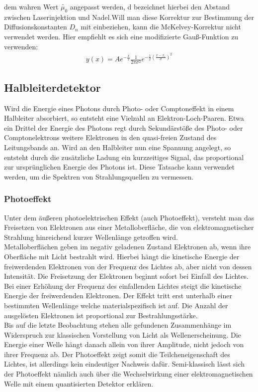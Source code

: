 \documentclass[12pt]{article}
\begin{document}
dem wahren Wert $\tilde{\mu_0}$ angepasst werden, d bezeichnet hierbei den Abstand zwischen
Laserinjektion und Nadel.Will man diese Korrektur zur Bestimmung der Diffusionskonstanten $D_n$ mit einbeziehen, kann die McKelvey-Korrektur nicht verwendet werden. Hier empfiehlt es sich eine modifizierte Gauß-Funktion zu verwenden:
\begin{align}
y(x)=A e^{-\frac{x}{\tau}}\frac{1}{2\pi\sigma^2}e^{-\frac{1}{2}(\frac{x-x_c}{\sigma})^2}
\end{align}

\subsection{Halbleiterdetektor}
Wird die Energie eines Photons durch Photo- oder Comptoneffekt in einem
Halbleiter absorbiert, so entsteht eine Vielzahl an Elektron-Loch-Paaren. Etwa
ein Drittel der Energie des Photons regt durch Sekundärstöße des Photo- oder
Comptonelektrons weitere Elektronen in den quasi-freien Zustand des Leitungsbands an.
 Wird an den Halbleiter nun eine Spannung angelegt, so entsteht durch die zusätzliche Ladung ein kurzzeitiges Signal, das proportional 
zur ursprünglichen Energie des Photons ist. Diese Tatsache kann verwendet werden, um die Spektren von
Strahlungsquellen zu vermessen.

\subsubsection{Photoeffekt}
Unter dem äußeren photoelektrischen Effekt (auch Photoeffekt), versteht man das Freisetzen von Elektronen aus einer Metalloberfläche, die von elektromagnetischer Strahlung hinreichend kurzer Wellenlänge getroffen wird.\\

Metalloberflächen geben im negativ geladenen Zustand Elektronen ab, wenn ihre Oberfläche mit Licht bestrahlt wird. Hierbei hängt die kinetische Energie der freiwerdenden Elektronen von der Frequenz des Lichtes ab, aber nicht von dessen Intensität.
Die Freisetzung der Elektronen beginnt sofort bei Einfall des Lichtes. Bei einer Erhöhung der Frequenz des einfallenden Lichtes steigt die kinetische Energie der freiwerdenden Elektronen. Der Effekt tritt erst unterhalb einer bestimmten Wellenlänge welche materialspezifisch ist auf. Die Anzahl der ausgelösten Elektronen ist proportional zur Bestrahlungsstärke.\\

Bis auf die letzte Beobachtung stehen alle gefundenen Zusammenhänge im Widerspruch zur klassischen Vorstellung von Licht als Wellenerscheinung. Die Energie einer Welle hängt danach allein von ihrer Amplitude, nicht jedoch von ihrer Frequenz ab. Der Photoeffekt zeigt somit die Teilcheneigenschaft des Lichtes, ist allerdings kein eindeutiger Nachweis dafür. Semi-klassisch lässt sich der Photoeffekt nämlich auch über die Wechselwirkung einer elektromagnetischen Welle mit einem quantisierten Detektor erklären.
\end{document}
